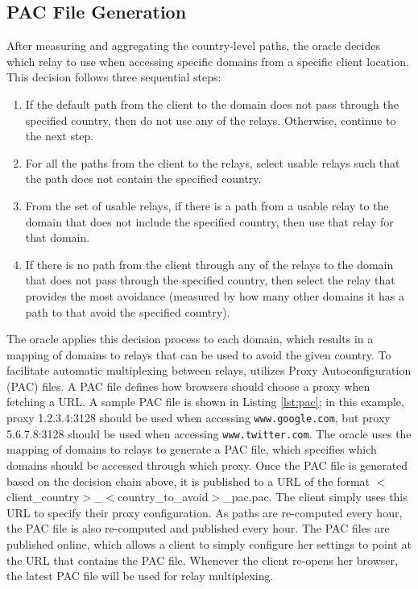 \subsection{PAC File Generation}
\label{multiplex}
After measuring and aggregating the country-level paths, the oracle decides 
which relay to use when accessing specific domains from a specific client 
location.  This decision follows three sequential steps:

\begin{enumerate}
\item If the default path from the client to the domain does not pass through 
the specified country, then do not use any of the relays. Otherwise, continue 
to the next step.
\item For all the paths from the client to the relays, select usable relays 
such that the path does not contain the specified country.
\item From the set of usable relays, if there is a path from a 
usable relay to the domain that does not include the specified country, then 
use that relay for that domain.
\item If there is no path from the client through any of the relays to the domain 
that does not pass through the specified country, then select the relay 
that provides the most avoidance (measured by how many other domains it has 
a path to that avoid the specified country).
\end{enumerate}

The oracle applies this decision process to each domain, which results in a mapping 
of domains to relays that can be used to avoid the given country.  To facilitate 
automatic multiplexing between relays, \system{} utilizes Proxy Autoconfiguration (PAC) 
files.  A PAC file defines how browsers should choose a proxy when fetching a URL.  A 
sample PAC file is shown in Listing \ref{lst:pac}; in this example, proxy 
1.2.3.4:3128 should be used when accessing {\tt www.google.com}, but proxy 
5.6.7.8:3128 should be used when accessing {\tt www.twitter.com}.  The oracle uses 
the mapping of domains to relays to generate a PAC 
file, which specifies which domains should be accessed through which proxy.  Once the PAC 
file is generated based on the decision chain above, it is published to a URL 
of the format $<$client\_country$>$\_$<$country\_to\_avoid$>$\_pac.pac.  The client 
simply uses this URL to specify their proxy configuration.  As paths are re-computed 
every hour, the PAC file is also re-computed and published every hour.  The PAC files 
are published online, which allows a client to simply configure her settings to 
point at the URL that contains the PAC file.  Whenever the client re-opens her 
browser, the latest PAC file will be used for relay multiplexing.

